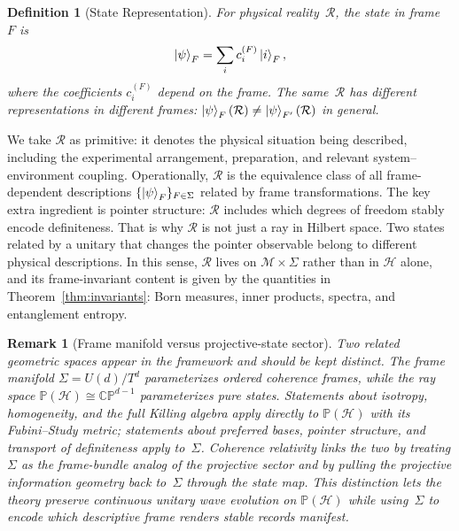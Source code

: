 \documentclass[aps,prd,twocolumn,superscriptaddress,nofootinbib,floatfix]{revtex4-2}
\newtheorem{definition}{Definition}
\newtheorem{remark}{Remark}
\newcommand{\Sig}{\Sigma}
\begin{document}
\begin{definition}[State Representation]
For physical reality~$\mathcal{R}$, the state in frame~$F$ is
\begin{equation}\label{eq:state-rep}
\ket{\psi}_F = \sum_i c_i^{(F)} \ket{i}_F,
\end{equation}
where the coefficients $c_i^{(F)}$ depend on the frame. The same~$\mathcal{R}$ has different representations in different frames: $\ket{\psi}_F(\mathcal{R}) \neq \ket{\psi}_{F'}(\mathcal{R})$ in general.
\end{definition}

We take $\mathcal{R}$ as primitive: it denotes the physical situation being described, including the experimental arrangement, preparation, and relevant system--environment coupling. Operationally, $\mathcal{R}$ is the equivalence class of all frame-dependent descriptions $\{\ket{\psi}_F\}_{F \in \Sig}$ related by frame transformations. The key extra ingredient is pointer structure: $\mathcal{R}$ includes which degrees of freedom stably encode definiteness. That is why $\mathcal{R}$ is not just a ray in Hilbert space. Two states related by a unitary that changes the pointer observable belong to different physical descriptions. In this sense, $\mathcal{R}$ lives on $\mathcal{M} \times \Sig$ rather than in $\mathcal{H}$ alone, and its frame-invariant content is given by the quantities in Theorem~\ref{thm:invariants}: Born measures, inner products, spectra, and entanglement entropy.

\begin{remark}[Frame manifold versus projective-state sector]\label{rem:flag-projective}
Two related geometric spaces appear in the framework and should be kept distinct. The frame manifold $\Sig = U(d)/T^d$ parameterizes ordered coherence frames, while the ray space $\mathbb{P}(\mathcal{H}) \cong \mathbb{CP}^{d-1}$ parameterizes pure states. Statements about isotropy, homogeneity, and the full Killing algebra apply directly to $\mathbb{P}(\mathcal{H})$ with its Fubini--Study metric; statements about preferred bases, pointer structure, and transport of definiteness apply to~$\Sig$. Coherence relativity links the two by treating $\Sig$ as the frame-bundle analog of the projective sector and by pulling the projective information geometry back to~$\Sig$ through the state map. This distinction lets the theory preserve continuous unitary wave evolution on $\mathbb{P}(\mathcal{H})$ while using~$\Sig$ to encode which descriptive frame renders stable records manifest.
\end{remark}
\end{document}
